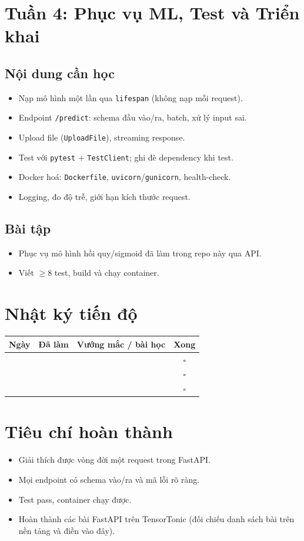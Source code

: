 \documentclass[11pt,a4paper]{article}
\newcommand{\week}[2]{\section{Tuần #1: #2}}
\begin{document}
\week{4}{Phục vụ ML, Test và Triển khai}
\subsection*{Nội dung cần học}
\begin{itemize}
  \item Nạp mô hình một lần qua \texttt{lifespan} (không nạp mỗi request).
  \item Endpoint \texttt{/predict}: schema đầu vào/ra, batch, xử lý input sai.
  \item Upload file (\texttt{UploadFile}), streaming response.
  \item Test với \texttt{pytest} + \texttt{TestClient}; ghi đè dependency khi test.
  \item Docker hoá: \texttt{Dockerfile}, \texttt{uvicorn}/\texttt{gunicorn}, health-check.
  \item Logging, đo độ trễ, giới hạn kích thước request.
\end{itemize}
\subsection*{Bài tập}
\begin{itemize}
  \item Phục vụ mô hình hồi quy/sigmoid đã làm trong repo này qua API.
  \item Viết $\ge 8$ test, build và chạy container.
\end{itemize}

\section*{Nhật ký tiến độ}
\begin{tabularx}{\textwidth}{@{}lXXc@{}}
\toprule
Ngày & Đã làm & Vướng mắc / bài học & Xong \\
\midrule
 & & & $\square$ \\
 & & & $\square$ \\
 & & & $\square$ \\
\bottomrule
\end{tabularx}

\section*{Tiêu chí hoàn thành}
\begin{itemize}
  \item[$\square$] Giải thích được vòng đời một request trong FastAPI.
  \item[$\square$] Mọi endpoint có schema vào/ra và mã lỗi rõ ràng.
  \item[$\square$] Test pass, container chạy được.
  \item[$\square$] Hoàn thành các bài FastAPI trên TensorTonic (đối chiếu danh sách bài trên nền tảng và điền vào đây).
\end{itemize}
\end{document}
